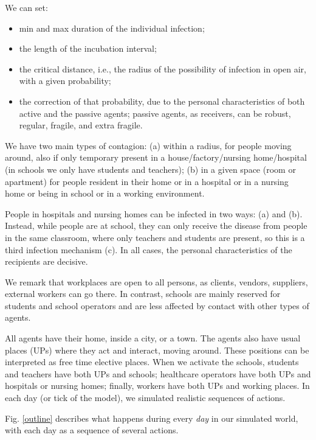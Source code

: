 \documentclass[graybox]{svmult}
\begin{document}
We can set: 
\begin{itemize}
\item min and max duration of the individual infection;

\item the length of the incubation interval;

\item the critical distance, i.e., the radius of the possibility of infection in open air, with a given probability;

\item the correction of that probability, due to the personal characteristics of both active and the passive agents; passive agents, as receivers, can be robust, regular, fragile, and extra fragile.

\end{itemize} 

We have two main types of contagion: (a) within a radius, for people moving around, also if only temporary present in a house/factory/nursing home/hospital (in schools we only have students and teachers); (b) in a given space (room or apartment) for people resident in their home or in a hospital or in a nursing home or being in school or in a working environment.

People in hospitals and nursing homes can be infected in two ways: (a) and (b). Instead, while people are at school, they can only receive the disease from people in the same classroom, where only teachers and students are present, so this is a third infection mechanism (c). In all cases, the personal characteristics of the recipients are decisive.

We remark that workplaces are open to all persons, as clients, vendors, suppliers, external workers can go there. In contrast, schools are mainly reserved for students and school operators and are less affected by contact with other types of agents.

All agents have their home, inside a city, or a town. The agents also have usual places (UPs) where they act and interact, moving around. These positions can be interpreted as free time elective places. When we activate the schools, students and teachers have both UPs and schools; healthcare operators have both UPs and hospitals or nursing homes; finally, workers have both UPs and working places. In each day (or tick of the model), we simulated realistic sequences of actions.




Fig. \ref{outline} describes what happens during every \emph{day} in our simulated world, with each day as a sequence of several actions.
\end{document}
